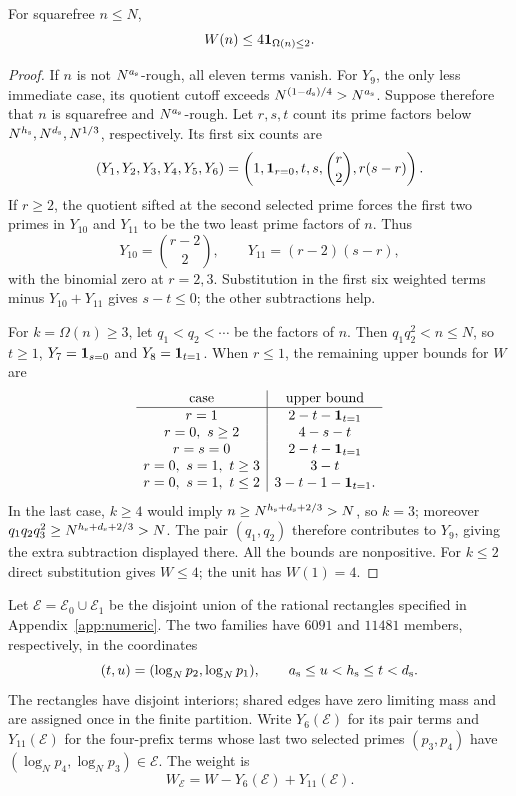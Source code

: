 \begin{lemma}
\label{lem:current-full-weight}
For squarefree $n\le N$,
\[
                  W(n)\le4{\mathbf 1}_{\Omega(n)\le2}.
\]
\end{lemma}

\begin{proof}
If $n$ is not $N^{a_{\rm s}}$-rough, all eleven terms vanish.  For $Y_9$, the
only less immediate case, its quotient cutoff exceeds
$N^{(1-{d_{\rm s}})/4}>N^{a_{\rm s}}$.  Suppose therefore that $n$ is squarefree and
$N^{a_{\rm s}}$-rough.  Let $r,s,t$ count its prime factors below $N^{h_{\rm s}},N^{d_{\rm s}},N^{1/3}$,
respectively.  Its first six counts are
\[
 (Y_1,Y_2,Y_3,Y_4,Y_5,Y_6)
      =\left(1,{\mathbf 1}_{r=0},t,s,\binom r2,r(s-r)\right).
\]
If $r\ge2$, the quotient sifted at the second selected prime forces
the first two primes in $Y_{10}$ and $Y_{11}$ to be the two least
prime factors of $n$.  Thus
\[
 Y_{10}=\binom{r-2}{2},\qquad Y_{11}=(r-2)(s-r),
\]
with the binomial zero at $r=2,3$.  Substitution in the first six
weighted terms minus $Y_{10}+Y_{11}$ gives $s-t\le0$; the other
subtractions help.

For $k=\Omega(n)\ge3$, let $q_1<q_2<\cdots$ be the factors of $n$.
Then $q_1q_2^2<n\le N$, so $t\ge1$,
$Y_7={\mathbf 1}_{s=0}$ and $Y_8={\mathbf 1}_{t=1}$.
When $r\le1$, the remaining upper bounds for $W$ are
\[
\begin{array}{c|c}
 \text{case}&\text{upper bound}\\ \hline
 r=1&2-t-{\mathbf 1}_{t=1}\\
 r=0,\ s\ge2&4-s-t\\
 r=s=0&2-t-{\mathbf 1}_{t=1}\\
 r=0,\ s=1,\ t\ge3&3-t\\
 r=0,\ s=1,\ t\le2&3-t-1-{\mathbf 1}_{t=1}.
\end{array}
\]
In the last case, $k\ge4$ would imply
$n\ge N^{{h_{\rm s}}+{d_{\rm s}}+2/3}>N$, so $k=3$; moreover
$q_1q_2q_3^2\ge N^{{h_{\rm s}}+{d_{\rm s}}+2/3}>N$.  The pair $(q_1,q_2)$ therefore
contributes to $Y_9$, giving the extra subtraction displayed there.
All the bounds are nonpositive.  For $k\le2$ direct substitution
gives $W\le4$; the unit has $W(1)=4$.
\end{proof}

Let $\mathscr E=\mathscr E_0\cup \mathscr E_1$ be the disjoint union of the rational rectangles
specified in Appendix~\ref{app:numeric}. The two families have $6091$ and
$11481$ members, respectively, in the coordinates
\[
 (t,u)=(\log_Np_2,\log_Np_1),\qquad {a_{\rm s}}\le u<{h_{\rm s}}\le t<{d_{\rm s}}.
\]
The rectangles have disjoint interiors; shared edges have zero limiting
mass and are assigned once in the finite partition.
Write $Y_6(\mathscr E)$
for its pair terms and $Y_{11}(\mathscr E)$ for the four-prefix terms whose
last two selected primes $(p_3,p_4)$ have
$(\log_Np_4,\log_Np_3)\in \mathscr E$.  The weight is
\begin{equation}
                         W_{\mathscr E}=W-Y_6(\mathscr E)+Y_{11}(\mathscr E).
 \label{eq:current-paired-weight}
\end{equation}

